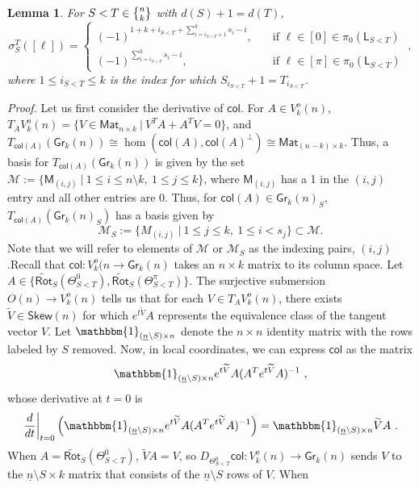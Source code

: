 \documentclass{article}
\newcommand{\mc}[1]{\mathcal{#1}}
\newcommand{\msf}[1]{\mathsf{#1}}
\newcommand{\gr}{\msf{Gr}}
\newcommand{\nchoosek}{\textstyle\genfrac{\lbrace}{\rbrace}{0pt}{}}
\newcommand{\trot}{\widetilde{\msf{Rot}}}
\newcommand{\uno}{\mathbbm{1}}
\newcommand{\mat}{\msf{Mat}}
\newcommand{\col}{\msf{col}}
\newcommand{\ul}[1]{\underline{#1}}
\newtheorem{lemma}[theorem]{Lemma}
\theoremstyle{definition}
\begin{document}
\begin{lemma}\label{boundarySchubert}
    For $S<T \in \nchoosek{n}{k}$ with $d(S)+1=d(T)$, 
    $$\sigma_S^T([\ell]) = \begin{cases}
                                            (-1)^{1+k+i_{S<T}+\sum\limits_{i=i_{S<T}+1}^k s_i-i}, &\quad \text{if } \ell \in [0] \in 
                                                \pi_0(\msf{L}_{S<T}) \\
                                            (-1)^{\sum\limits_{i=i_{S<T}}^k s_i-i}, &\quad
                                                \text{if } \ell \in [\pi] \in \pi_0(\msf{L}_{S<T})
                                        \end{cases}~,$$
    where $1 \le i_{S<T} \le k$ is the index for which $S_{i_{S<T}}+1=T_{i_{S<T}}$.
\end{lemma}
{\it Proof.}
Let us first consider the derivative of $\col$. 
For $A \in V_k^o(n)$, $T_AV_k^o(n) = \{V \in \mat_{n\times k} ~|~ V^TA + A^TV = 0\}$,
and $T_{\col(A)}(\gr_k(n)) \cong \hom(\col(A), \col(A)^\perp) \cong \mat_{(n-k) \times k}$. Thus, a basis
for $T_{\col(A)}(\gr_k(n))$ is given by the set $\mc{M} := \{\msf{M}_{(i,j)} ~|~ 1 \le i \le n \setminus k, ~1 \le j
\le k\}$, where $\msf{M}_{(i,j)}$ has a 1 in the $(i,j)$ entry and all other entries are 0.
Thus, for $\col(A) \in \gr_k(n)_S$, $T_{\col(A)}(\gr_k(n)_S)$ has a basis given by
$$\mc{M}_S := \{M_{(i,j)} ~|~ 1 \le j \le k, ~ 1 \le i < s_j\} \subset \mc{M}.$$
Note that we will refer to elements of $\mc{M}$ or $\mc{M}_S$ as the indexing pairs, $(i,j)$.Recall that $\col:V_k^o(n \to \gr_k(n)$ takes an $n\times k$
matrix to its column space. Let $A \in \{\trot_S(\Theta_{S<T}^0),\trot_S(\Theta_{S<T}^\pi)\}$.
The surjective submersion $O(n) \to V_k^o(n)$ tells us that for each 
$V \in T_AV_k^o(n)$, there
exists $\widetilde{V} \in \msf{Skew}(n)$ for which $e^{t\widetilde{V}}A$ represents the equivalence class of the
tangent vector $V$. 
Let $\uno_{(\ul{n}\setminus S) \times n}$ denote the $n\times n$ identity matrix with the rows labeled by $S$ removed.
Now, in local coordinates, we can express $\col$ as the matrix 
$$\uno_{(\ul{n}\setminus S) \times n} e^{t\widetilde{V}}A(A^Te^{t\widetilde{V}}A)^{-1}~,$$
whose derivative at $t=0$ is
$$\frac{d}{dt}\bigg|_{t=0} \left(\uno_{(\ul{n}\setminus S) \times n} e^{t\widetilde{V}}A(A^Te^{t\widetilde{V}}A)^{-1}
    \right) = \uno_{(\ul{n}\setminus S) \times n} \widetilde{V} A~.$$
When $A = \trot_S(\Theta_{S<T}^0)$, $\widetilde{V}A = V$, so $D_{\Theta_{S<T}^0} \col : V_k^o(n) \to \gr_k(n)$
sends $V$ to the $\ul{n}\setminus S \times k$ matrix that consists of the $\ul{n}\setminus S$ rows of $V$. When
\end{document}
